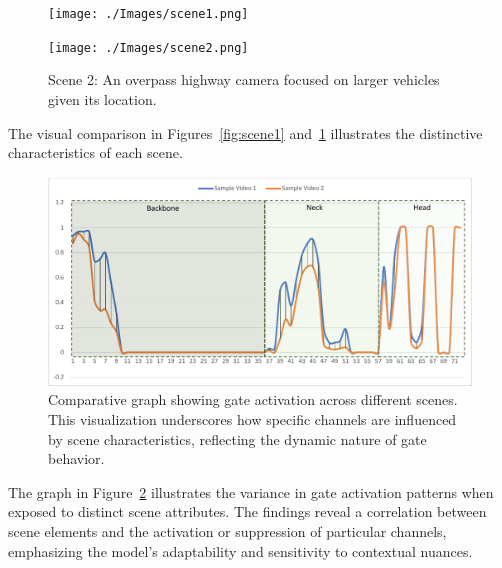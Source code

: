 \documentclass[runningheads]{llncs}
\begin{document}
\begin{figure}[ht]
    \centering
    \begin{minipage}{0.45\textwidth}
    \texttt{[image: ./Images/scene1.png]}
    \caption{Scene 1: An intersection with a broader spectrum of car sizes.}
    \label{fig:scene1}
    \end{minipage}
    \hfill
    \begin{minipage}{0.45\textwidth}
    \texttt{[image: ./Images/scene2.png]}
    \caption{Scene 2: An overpass highway camera focused on larger vehicles given its location.}
    \label{fig:scene2}
    \end{minipage}
    \end{figure}
    

The visual comparison in Figures~\ref{fig:scene1} and~\ref{fig:scene2} illustrates the distinctive characteristics of each scene.

\begin{figure}[ht]
\centering
\includegraphics[width=\linewidth]{./Images/vari-viod.pdf}
\caption{Comparative graph showing gate activation across different scenes. This visualization underscores how specific channels are influenced by scene characteristics, reflecting the dynamic nature of gate behavior.}
\label{fig:comparative_analysis}
\end{figure}

The graph in Figure~\ref{fig:comparative_analysis} illustrates the variance in gate activation patterns when exposed to distinct scene attributes. The findings reveal a correlation between scene elements and the activation or suppression of particular channels, emphasizing the model's adaptability and sensitivity to contextual nuances.
\end{document}
